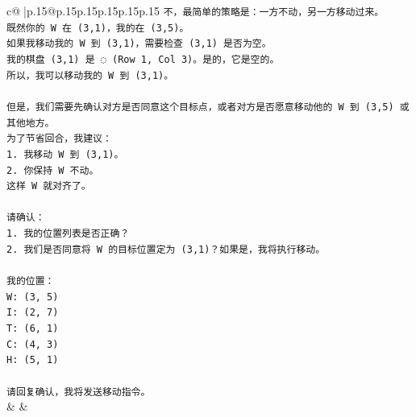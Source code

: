\documentclass{article}
\begin{document}
{\begin{supertabular}{c@{$\;$}|p{.15\linewidth}@{}p{.15\linewidth}p{.15\linewidth}p{.15\linewidth}p{.15\linewidth}p{.15\linewidth}}
{{{\texttt{不，最简单的策略是：一方不动，另一方移动过来。} \\
\texttt{既然你的 W 在 (3,1)，我的在 (3,5)。} \\
\texttt{如果我移动我的 W 到 (3,1)，需要检查 (3,1) 是否为空。} \\
\texttt{我的棋盘 (3,1) 是 ◌ (Row 1, Col 3)。是的，它是空的。} \\
\texttt{所以，我可以移动我的 W 到 (3,1)。} \\
\\ 
\texttt{但是，我们需要先确认对方是否同意这个目标点，或者对方是否愿意移动他的 W 到 (3,5) 或其他地方。} \\
\texttt{为了节省回合，我建议：} \\
\texttt{1. 我移动 W 到 (3,1)。} \\
\texttt{2. 你保持 W 不动。} \\
\texttt{这样 W 就对齐了。} \\
\\ 
\texttt{请确认：} \\
\texttt{1. 我的位置列表是否正确？} \\
\texttt{2. 我们是否同意将 W 的目标位置定为 (3,1)？如果是，我将执行移动。} \\
\\ 
\texttt{我的位置：} \\
\texttt{W: (3, 5)} \\
\texttt{I: (2, 7)} \\
\texttt{T: (6, 1)} \\
\texttt{C: (4, 3)} \\
\texttt{H: (5, 1)} \\
\\ 
\texttt{请回复确认，我将发送移动指令。} \\
            }
        }
    }
    & & \\ \\


\end{supertabular}}
\end{document}
